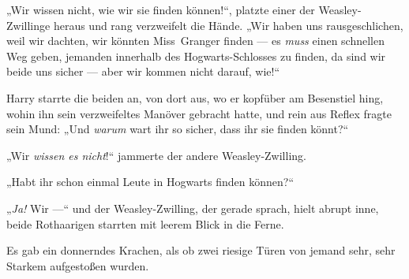 „Wir wissen nicht, wie wir sie finden können!“, platzte einer der Weasley-Zwillinge heraus und rang verzweifelt die Hände.
„Wir haben uns rausgeschlichen, weil wir dachten, wir könnten Miss~Granger finden — es \emph{muss} einen schnellen Weg geben, jemanden innerhalb des Hogwarts-Schlosses zu finden, da sind wir beide uns sicher — aber wir kommen nicht darauf, wie!“

Harry starrte die beiden an, von dort aus, wo er kopfüber am Besenstiel hing, wohin ihn sein verzweifeltes Manöver gebracht hatte, und rein aus Reflex fragte sein Mund:
„Und \emph{warum} wart ihr so sicher, dass ihr sie finden könnt?“

„Wir \emph{wissen es nicht}!“ jammerte der andere Weasley-Zwilling.

„Habt ihr schon einmal Leute in Hogwarts finden können?“

„\emph{Ja!} Wir —“ und der Weasley-Zwilling, der gerade sprach, hielt abrupt inne, beide Rothaarigen starrten mit leerem Blick in die Ferne.

Es gab ein donnerndes Krachen, als ob zwei riesige Türen von jemand sehr, sehr Starkem aufgestoßen wurden.

